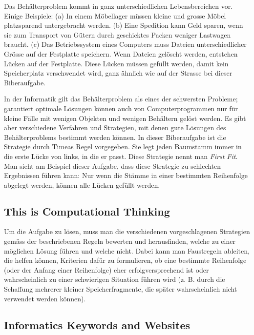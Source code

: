 \documentclass[a4paper,11pt]{report}
\begin{document}
Das Behälterproblem kommt in ganz unterschiedlichen Lebensbereichen vor. Einige Beispiele: (a) In einem Möbellager müssen kleine und grosse Möbel platzsparend untergebracht werden. (b) Eine Spedition kann Geld sparen, wenn sie zum Transport von Gütern durch geschicktes Packen weniger Lastwagen braucht. (c) Das Betriebssystem eines Computers muss Dateien unterschiedlicher Grösse auf der Festplatte speichern. Wenn Dateien gelöscht werden, entstehen Lücken auf der Festplatte. Diese Lücken müssen gefüllt werden, damit kein Speicherplatz verschwendet wird, ganz ähnlich wie auf der Strasse bei dieser Biberaufgabe.

In der Informatik gilt das Behälterproblem als eines der schwersten Probleme; garantiert optimale Lösungen können auch von Computerprogrammen nur für kleine Fälle mit wenigen Objekten und wenigen Behältern gelöst werden. Es gibt aber verschiedene Verfahren und Strategien, mit denen gute Lösungen des Behälterproblems bestimmt werden können. In dieser Biberaufgabe ist die Strategie durch Timeas Regel vorgegeben. Sie legt jeden Baumstamm immer in die erste Lücke von links, in die er passt. Diese Strategie nennt man \emph{First Fit}. Man sieht am Beispiel dieser Aufgabe, dass diese Strategie zu schlechten Ergebnissen führen kann: Nur wenn die Stämme in einer bestimmten Reihenfolge abgelegt werden, können alle Lücken gefüllt werden.


\subsection*{This is Computational Thinking}

Um die Aufgabe zu lösen, muss man die verschiedenen vorgeschlagenen Strategien gemäss der beschriebenen Regeln bewerten und herausfinden, welche zu einer möglichen Lösung führen und welche nicht. Dabei kann man Faustregeln ableiten, die helfen können, Kriterien dafür zu formulieren, ob eine bestimmte Reihenfolge (oder der Anfang einer Reihenfolge) eher erfolgversprechend ist oder wahrscheinlich zu einer schwierigen Situation führen wird (z. B. durch die Schaffung mehrerer kleiner Speicherfragmente, die später wahrscheinlich nicht verwendet werden können).


\subsection*{Informatics Keywords and Websites}
\end{document}
